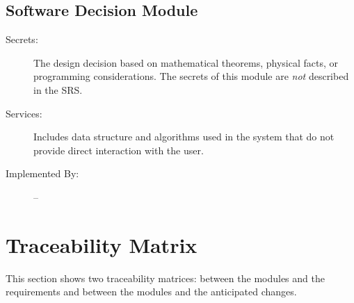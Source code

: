 \documentclass[12pt, titlepage]{article}
\begin{document}
	
	\subsection{Software Decision Module}
	
	\begin{description}
		\item[Secrets:] The design decision based on mathematical theorems, physical
		facts, or programming considerations. The secrets of this module are
		\emph{not} described in the SRS.
		\item[Services:] Includes data structure and algorithms used in the system that
		do not provide direct interaction with the user. 
		\item[Implemented By:] --
	\end{description}
	
	\newpage
	
	\section{Traceability Matrix} \label{SecTM}
	
	This section shows two traceability matrices: between the modules and the
	requirements and between the modules and the anticipated changes.
	
\end{document}

